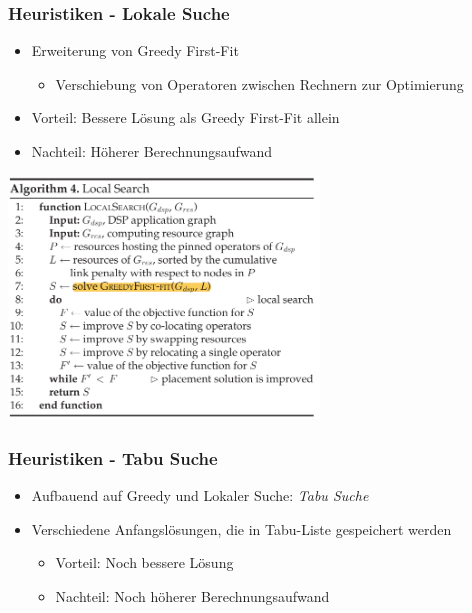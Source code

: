 \documentclass{beamer}
\begin{document}
\begin{frame}
\frametitle{Heuristiken - Lokale Suche}
\begin{itemize}
    \item Erweiterung von Greedy First-Fit
    \begin{itemize}
        \item Verschiebung von Operatoren zwischen Rechnern zur Optimierung
    \end{itemize}
    \item Vorteil: Bessere Lösung als Greedy First-Fit allein
    \item Nachteil: Höherer Berechnungsaufwand
\end{itemize}
    \begin{center}
        \includegraphics[width=0.62\textwidth]{res/algorithmus-lokale-suche.png}
    \end{center}

\end{frame}

\begin{frame}
\frametitle{Heuristiken - Tabu Suche}
\begin{itemize}
    \item Aufbauend auf Greedy und Lokaler Suche: \textit{Tabu Suche}
    \item Verschiedene Anfangslösungen, die in Tabu-Liste gespeichert werden
    \begin{itemize}
        \item Vorteil: Noch bessere Lösung
        \item Nachteil: Noch höherer Berechnungsaufwand
    \end{itemize}
\end{itemize}
\end{frame}

\end{document}
